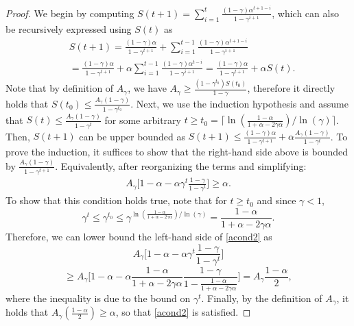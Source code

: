\documentclass[conference]{IEEEtran}
\begin{document}
\begin{proof}
 We begin by computing 
 $S(t+1) = \sum_{i=1}^{t}  \frac{(1-\gamma)\alpha^{t+1-i}}{1 - \gamma^{i+1}} $, which can also be recursively expressed using $S(t)$ as
    \begin{align}
        &S(t+1) =  \frac{(1-\gamma)\alpha}{1-\gamma^{t+1}} + \sum_{i=1}^{t-1}  \frac{(1-\gamma)\alpha^{t+1-i}}{1 - \gamma^{i+1}}\nonumber\nonumber\\
        &\!\!{=}\frac{(1-\gamma)\alpha}{1-\gamma^{t+1}} + \alpha \sum_{i=1}^{t-1}  \frac{(1-\gamma)\alpha^{t-i}}{1 - \gamma^{i+1}} = \frac{(1-\gamma)\alpha}{1-\gamma^{t+1}} + \alpha S(t).\label{Discount_Sum_recursive}
    \end{align}
Note that by definition of $A_\gamma$, we have $A_\gamma \geq \frac{(1-\gamma^{t_0})S(t_0)}{1-\gamma}$, therefore it directly holds that $S(t_0) \leq \frac{A_\gamma(1-\gamma)}{1-\gamma^{t_0}}$. Next, we use the induction hypothesis and assume that $ S(t) \leq \frac{A_\gamma(1-\gamma)}{1-\gamma^t}$ for some arbitrary $t\geq t_0 =\lceil\ln(\frac{1-\alpha}{1+\alpha-2\gamma\alpha})/\ln(\gamma)\rceil$. Then, $S(t+1)$ can be upper bounded as $S(t+1) \leq  \frac{(1-\gamma)\alpha}{1-\gamma^{t+1}} + \alpha  \frac{A_\gamma(1-\gamma)}{1-\gamma^t}$. To prove the induction, it suffices to show that 
    the right-hand side above is bounded by $\frac{A_\gamma(1-\gamma)}{1-\gamma^{t+1}}$. Equivalently, after reorganizing the terms and simplifying:
\begin{align}
    A_\gamma\Big[
1-\alpha-\alpha\gamma^t\frac{
1-\gamma}{1-\gamma^t}
\Big]
\geq \alpha.
\label{acond2}
\end{align}
    To show that this condition holds true, note that for $t\geq t_0$ and since $\gamma<1$,
    $$
    \gamma^t\leq \gamma^{t_0}
    \leq
    \gamma^{\ln(\frac{1-\alpha}{1+\alpha-2\gamma\alpha})/\ln(\gamma)}
    =
\frac{1-\alpha}{1+\alpha-2\gamma\alpha}.
    $$
    Therefore, we can lower bound the left-hand side of \eqref{acond2} as
    $$
    A_\gamma\Big[
1-\alpha-\alpha\gamma^t\frac{
1-\gamma}{1-\gamma^t}
\Big]
$$$$
\geq
A_\gamma\Big[
1-\alpha-\alpha
\frac{1-\alpha}{1+\alpha-2\gamma\alpha}
\frac{
1-\gamma}{1-\frac{1-\alpha}{1+\alpha-2\gamma\alpha}}
\Big]
=
A_\gamma\frac{1-\alpha}{2},
    $$
    where the inequality is due to the bound on $\gamma^t$.
    Finally, by the definition of 
    $A_\gamma$, it holds that 
    $A_\gamma(\frac{1-\alpha}{2})\geq \alpha$, 
    so that \eqref{acond2} is satisfied.

\end{proof}
\end{document}
